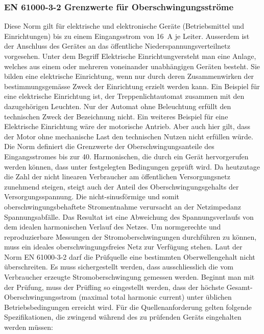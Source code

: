 \begin{appendix}
\subsubsection{EN 61000-3-2 Grenzwerte für Oberschwingungsströme}\label{sec:Stromnormen_ZF}
Diese Norm gilt für elektrische und elektronische Geräte (Betriebsmittel und Einrichtungen) bis zu einem Eingangsstrom von \SI{16}{A} je Leiter. Ausserdem ist der Anschluss des Gerätes an das öffentliche Niederspannungsverteilnetz vorgesehen. Unter dem Begriff \grqq Elektrische Einrichtung\grqq versteht man eine Anlage, welches aus einem oder mehreren voneinander unabhängigen Geräten besteht. Sie bilden eine elektrische Einrichtung, wenn nur durch deren Zusammenwirken der bestimmungsgemässe Zweck der Einrichtung erzielt werden kann. Ein Beispiel für eine elektrische Einrichtung ist, der Treppenlichtautomat zusammen mit den dazugehörigen Leuchten. Nur der Automat ohne Beleuchtung erfüllt den technischen Zweck der Bezeichnung nicht. Ein weiteres Beispiel für eine \grqq Elektrische Einrichtung \grqq wäre der motorische Antrieb. Aber auch hier gilt, dass der Motor ohne mechanische Last den technischen Nutzen nicht erfüllen würde.\\
Die Norm definiert die Grenzwerte der Oberschwingungsanteile des Eingangsstromes bis zur 40. Harmonischen, die durch ein Gerät hervorgerufen werden können, dass unter festgelegten Bedingungen geprüft wird. Da heutzutage die Zahl der nicht linearen Verbraucher am öffentlichen Versorgungsnetz zunehmend steigen, steigt auch der Anteil des Oberschwingungsgehalts der Versorgungsspannung. Die nicht-sinusförmige und somit oberschwingungsbehaftete Stromentnahme verursacht an der Netzimpedanz Spannungsabfälle. Das Resultat ist eine Abweichung des Spannungsverlaufs von dem idealen harmonischen Verlauf des Netzes. Um normgerechte und reproduzierbare Messungen der Stromoberschwingungen durchführen zu können, muss ein ideales oberschwingungsfreies Netz zur Verfügung stehen. Laut der Norm EN 61000-3-2 darf die Prüfquelle eine bestimmten Oberwellengehalt nicht überschreiten. Es muss sichergestellt werden, dass ausschliesslich die vom Verbraucher erzeugte Stromoberschwingung gemessen werden. Beginnt man mit der Prüfung, muss der Prüfling so eingestellt werden, dass der höchste Gesamt-Oberschwingungsstrom (maximal total harmonic current) unter üblichen Betriebsbedingungen erreicht wird. Für die Quellenanforderung gelten folgende Spezifikationen, die zwingend während des zu prüfenden Geräts eingehalten werden müssen:


\end{appendix}
